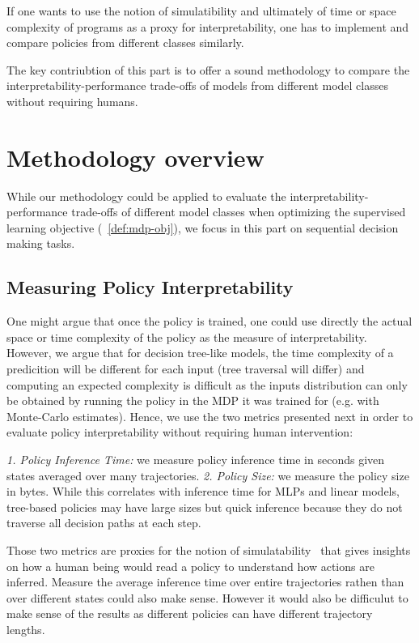 If one wants to use the notion of simulatibility and ultimately of time or space complexity of programs as a proxy for interpretability, one has to implement and compare policies from different classes similarly.

The key contriubtion of this part is to offer a sound methodology to compare the interpretability-performance trade-offs of models from different model classes without requiring humans.

\section{Methodology overview}
While our methodology could be applied to evaluate the interpretability-performance trade-offs of different model classes when optimizing the supervised learning objective (~\ref{def:mdp-obj}), we focus in this part on sequential decision making tasks.

\subsection{Measuring Policy Interpretability}
One might argue that once the policy is trained, one could use directly the actual space or time complexity of the policy as the measure of interpretability.
However, we argue that for decision tree-like models, the time complexity of a predicition will be different for each input (tree traversal will differ) and computing an expected complexity is difficult as the inputs distribution can only be obtained by running the policy in the MDP it was trained for (e.g. with Monte-Carlo estimates).  
Hence, we use the two metrics presented next in order to evaluate policy interpretability without requiring human intervention:

\textit{1. Policy Inference Time:} we measure policy inference time in seconds given states averaged over many trajectories.
\textit{2. Policy Size:} we measure the policy size in bytes. While this correlates with inference time for MLPs and linear models, tree-based policies may have large sizes but quick inference because they do not traverse all decision paths at each step.

Those two metrics are proxies for the notion of simulatability~\cite{mythos} that gives insights on how a human being would read a policy to understand how actions are inferred.
Measure the average inference time over entire trajectories rathen than over different states could also make sense.
However it would also be difficulut to make sense of the results as different policies can have different trajectory lengths.

